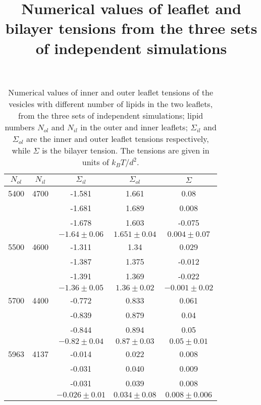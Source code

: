 \documentclass{article}
\title{Numerical  values of leaflet and bilayer tensions from the three sets of independent simulations}
\begin{document}
\maketitle

\newpage

\begin{table}
    \centering
    \caption{Numerical  values of inner and outer leaflet tensions of the vesicles with different number of lipids in the two leaflets, from the three sets of independent simulations; 
    lipid numbers $N_{ol}$ and $N_{il}$ in the outer and inner leaflets; $\Sigma_{il}$ and $\Sigma_{ol}$ are the inner and outer leaflet tensions respectively, while $\Sigma$ is the bilayer tension. The tensions are given in units of $k_B T/d^2$.}
    \begin{tabular}{|c|c|c|c|c|}
    \hline
     $N_{ol}$ & $N_{il}$   & $\Sigma_{il}$ & $\Sigma_{ol}$ & $\Sigma$ \\
     \hline
      5400    &  4700      &  -1.581       &   1.661       &    0.08     \\
              &            &  -1.681       &   1.689       &    0.008    \\
              &            &  -1.678       &   1.603       &   -0.075    \\
  \hline
              &       &  $-1.64 \pm 0.06$ &  $1.651 \pm 0.04$  &    $0.004 \pm 0.07$ \\
  \hline
              
      5500    &  4600      &  -1.311      &   1.34       &     0.029     \\
              &            &  -1.387      &   1.375      &    -0.012     \\
              &            &  -1.391      &   1.369      &    -0.022     \\
    \hline
              &            & $-1.36 \pm 0.05$  & $1.36 \pm 0.02$ & $-0.001 \pm 0.02$ \\
    \hline
      5700    &  4400      & -0.772       &    0.833     &     0.061      \\
              &            & -0.839       &    0.879     &     0.04       \\
              &            & -0.844       &    0.894     &     0.05       \\
    \hline
              &            & $-0.82 \pm 0.04$  &  $0.87 \pm 0.03$  &  $0.05 \pm 0.01$ \\
    \hline

    5963      &  4137      & -0.014       &   0.022      &    0.008      \\
              &            & -0.031       &   0.040      &    0.009      \\
              &            & -0.031       &   0.039      &    0.008       \\
    \hline
            &            & $-0.026 \pm 0.01$   & $0.034 \pm 0.08$  &  $0.008 \pm 0.006$ \\
    \hline
    
     \end{tabular}
\end{table}


     
\end{document}
